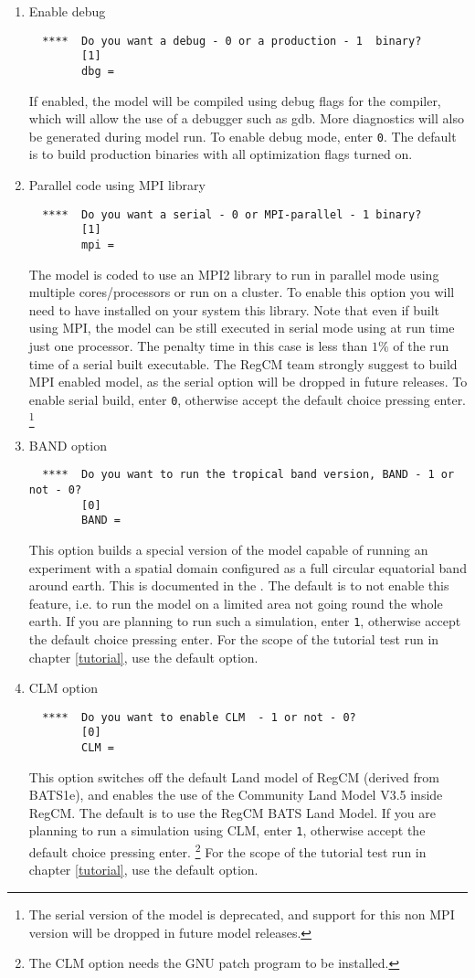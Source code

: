 \begin{enumerate}
\item Enable debug
\begin{Verbatim}
  ****  Do you want a debug - 0 or a production - 1  binary?
        [1]
        dbg =
\end{Verbatim}
If enabled, the model will be compiled using debug flags for the compiler,
which will allow the use of a debugger such as gdb. More diagnostics will
also be generated during model run. To enable debug mode, enter \verb=0=.
The default is to build production binaries with all optimization flags
turned on.
\item Parallel code using MPI library
\begin{Verbatim}
  ****  Do you want a serial - 0 or MPI-parallel - 1 binary?
        [1]
        mpi =
\end{Verbatim}
The model is coded to use an MPI2 library to run in parallel mode using
multiple cores/processors or run on a cluster. To enable this option you
will need to have installed on your system this library. Note that even
if built using MPI, the model can be still executed in serial mode using
at run time just one processor. The penalty time in this case is less than
$1\%$ of the run time of a serial built executable. The RegCM team
strongly suggest to build MPI enabled model, as the serial option will be
dropped in future releases. To enable serial build, enter \verb=0=, otherwise
accept the default choice pressing enter. \footnote{The serial version of the
model is deprecated, and support for this non MPI version will be dropped in
future model releases.}
\item BAND option
\begin{Verbatim}
  ****  Do you want to run the tropical band version, BAND - 1 or not - 0?
        [0]
        BAND =
\end{Verbatim}
This option builds a special version of the model capable of running an
experiment with a spatial domain configured as a full circular equatorial
band around earth. This is documented in the \cite{refman_11}.
The default is to not enable this feature, i.e. to run the model on a limited
area not going round the whole earth. If you are planning to run such a
simulation, enter \verb=1=, otherwise accept the default choice pressing enter.
For the scope of the tutorial test run in chapter \ref{tutorial}, use the
default option.
\item CLM option
\begin{Verbatim}
  ****  Do you want to enable CLM  - 1 or not - 0? 
        [0]
        CLM =
\end{Verbatim}
This option switches off the default Land model of RegCM (derived from BATS1e),
and enables the use of the Community Land Model V3.5 inside RegCM. The default
is to use the RegCM BATS Land Model. If you are planning to run a simulation
using CLM, enter \verb=1=, otherwise accept the default choice pressing enter.
\footnote{The CLM option needs the GNU patch program to be installed.}
For the scope of the tutorial test run in chapter \ref{tutorial}, use the
default option.
\end{enumerate}

